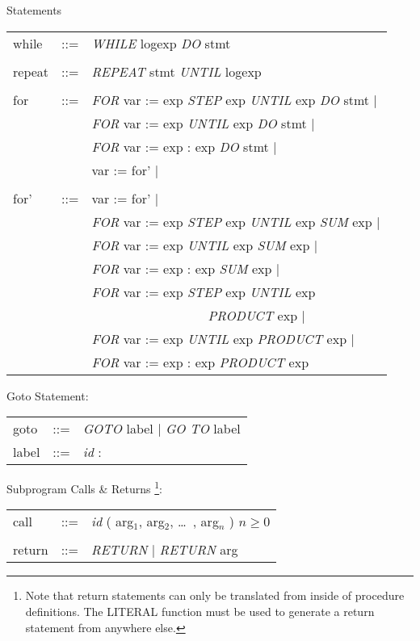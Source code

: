 \begin{describe}{Statements}
\begin{tabular}{lll}
while & ::= & {\it WHILE\/} logexp {\it DO\/} stmt\\
& &\\
repeat & ::= & {\it REPEAT\/} stmt {\it UNTIL\/} logexp\\
& &\\
for & ::= & {\it FOR\/} var := exp {\it STEP\/} exp {\it UNTIL\/} exp
{\it DO\/} stmt $\mid$\\
& &{\it FOR\/} var := exp {\it UNTIL\/} exp {\it DO\/} stmt $\mid$\\
& &{\it FOR\/} var := exp : exp {\it DO\/} stmt $\mid$\\
& &var := for' $\mid$ \\
& &\\
for' & ::= & var := for' $\mid$\\
& &{\it FOR\/} var := exp {\it STEP\/} exp {\it UNTIL\/} exp {\it SUM\/} exp
 $\mid$\\
& &{\it FOR\/} var := exp {\it UNTIL\/} exp {\it SUM\/} exp $\mid$\\
& &{\it FOR\/} var := exp : exp {\it SUM\/} exp $\mid$\\
& &{\it FOR\/} var := exp {\it STEP\/} exp {\it UNTIL\/} exp\\
& & \ \ \ \ \ \ \ \ \ \ \ \ \ \ \ \ \ \ {\it PRODUCT\/} exp $\mid$ \\
& &{\it FOR\/} var := exp {\it UNTIL\/} exp {\it PRODUCT\/} exp $\mid$\\
& &{\it FOR\/} var := exp : exp {\it PRODUCT\/} exp\\
\end{tabular}

Goto Statement:

\begin{tabular}{lll}
goto & ::= & {\it GOTO\/} label  $\mid$ {\it GO TO\/} label\\
label & ::= & {\it id\/} :\\
\end{tabular}

Subprogram Calls \& Returns \footnote{ Note that return statements can
only be translated from inside of procedure definitions.
 The LITERAL function must be used to generate
a return statement from anywhere else.}:

\begin{tabular}{lll}
call & ::= & {\it id\/} ( arg$_1$, arg$_2$, \dots\ , arg$_n$ ) $n \geq 0$\\
& &\\
return & ::= & {\it RETURN\/} $\mid$ {\it RETURN\/} arg\\
\end{tabular}


\end{describe}
